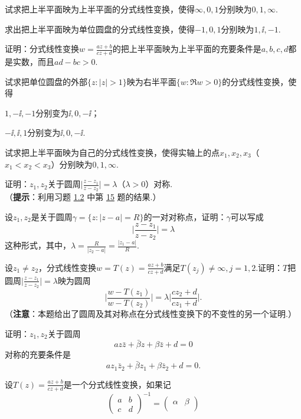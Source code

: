 \begin{xiti}
  \item 试求把上半平面映为上半平面的分式线性变换，使得$\infty,0,1$分别映为$0,1,\infty$.
  \item 求出把上半平面映为单位圆盘的分式线性变换，使得$-1,0,1$分别映为$1,\ii,-1$.
  \item 证明：分式线性变换$w=\frac{az+b}{cz+d}$的把上半平面映为上半平面的充要条件是$a,b,c,d$都是实数，而且$ad-bc>0$.
  \item 试求把单位圆盘的外部$\{z:|z|>1\}$映为右半平面$\{w:\Re w>0\}$的分式线性变换，使得
    \begin{enuma}
      \item $1,-\ii,-1$分别变为$\ii,0,-\ii$；
      \item $-\ii,\ii,1$分别变为$\ii,0,-\ii$.
    \end{enuma}
  \item 试求把上半平面映为自己的分式线性变换，使得实轴上的点$x_1,x_2,x_3$（$x_1<x_2<x_3$）分别映为$0,1,\infty$.
  \item 证明：$z_1,z_2$关于圆周$\bigg|\frac{z-z_1}{z-z_2}\bigg|=\lambda$（$\lambda>0$）对称.\\
     （\textbf{提示}：利用习题 \hyperlink{xiti1.2}{1.2} 中第 \hyperlink{xiti1.2.15}{15} 题的结果.）
  \item 设$z_1,z_2$是关于圆周$\gamma=\{z:|z-a|=R\}$的一对对称点，证明：$\gamma$可以写成
    \[
      \bigg|\frac{z-z_1}{z-z_2}\bigg| = \lambda
    \]
    这种形式，其中，$\lambda=\frac R{|z_2-a|}=\frac{|z_1-a|}R$.
  \item 设$z_1\ne z_2$，分式线性变换$w=T(z)=\frac{az+b}{cz+d}$满足$T(z_j)\ne\infty,j=1,2$.证明：$T$把圆周$\bigg|\frac{z-z_1}{z-z_2}\bigg|=\lambda$映为圆周
    \[
      \bigg|\frac{w-T(z_1)}{w-T(z_2)}\bigg| = \lambda\bigg|\frac{cz_2+d}{cz_1+d}\bigg|.
    \]
    （\textbf{注意}：本题给出了圆周及其对称点在分式线性变换下的不变性的另一个证明.）
  \item 证明：$z_1,z_2$关于圆周
    \[
    az\bar z + \bar \beta z + \beta\bar z + d = 0
    \]
    对称的充要条件是
    \[
      az_1\bar z_2 + \bar \beta z_1 + \beta\bar z_2 + d = 0.
    \]
  \item 设$T(z)=\frac{az+b}{cz+d}$是一个分式线性变换，如果记
    \[
      \begin{pmatrix}
        a & b \\
        c & d
      \end{pmatrix}^{-1}
      = \begin{pmatrix}
      \alpha & \beta \\

\end{pmatrix}\]
\end{xiti}
